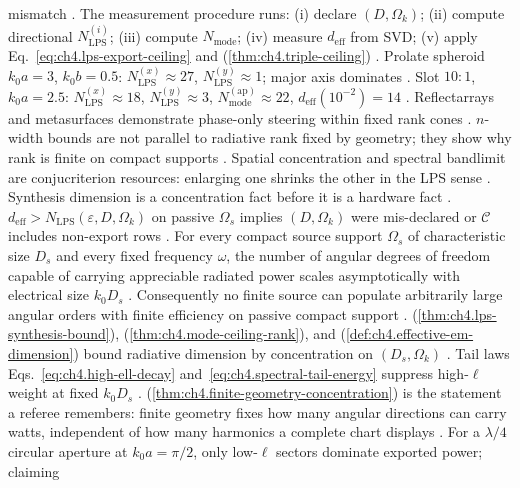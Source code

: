 mismatch \cite{hansen1988}.
The measurement procedure runs: (i) declare \((D,\Omega_{k})\); (ii) compute directional \(N_{\mathrm{LPS}}^{(i)}\); (iii) compute \(N_{\mathrm{mode}}\);
(iv) measure \(d_{\mathrm{eff}}\) from SVD; (v) apply Eq.~\eqref{eq:ch4.lps-export-ceiling} and (\ref{thm:ch4.triple-ceiling})
\cite{hansen1988}.
Prolate spheroid \(k_{0}a=3\), \(k_{0}b=0.5\): \(N_{\mathrm{LPS}}^{(x)}\approx27\), \(N_{\mathrm{LPS}}^{(y)}\approx1\); major axis dominates
\cite{hansen1988}.
Slot \(10{:}1\), \(k_{0}a=2.5\): \(N_{\mathrm{LPS}}^{(x)}\approx18\), \(N_{\mathrm{LPS}}^{(y)}\approx3\), \(N_{\mathrm{mode}}^{\mathrm{(ap)}}\approx22\),
\(d_{\mathrm{eff}}(10^{-2})=14\) \cite{hansen1988}.
Reflectarrays and metasurfaces demonstrate phase-only steering within fixed rank cones \cite{harrington2001}.
\(n\)-width bounds are not parallel to radiative rank fixed by geometry; they show why rank is finite on compact supports \cite{hansen1988}.
Spatial concentration and spectral bandlimit are conjucriterion resources: enlarging one shrinks the other in the LPS sense \cite{jackson1999}.
Synthesis dimension is a concentration fact before it is a hardware fact \cite{harrington2001}.
\label{cor:ch4.lps-domain}
\(d_{\mathrm{eff}}>N_{\mathrm{LPS}}(\varepsilon,D,\Omega_{k})\) on passive \(\Omega_{s}\) implies \((D,\Omega_{k})\) were mis-declared or
\(\mathcal{C}\) includes non-export rows \cite{hansen1988}.
\label{thm:ch4.finite-geometry-concentration}
For every compact source support $\Omega_{s}$ of characteristic size $D_{s}$ and every fixed frequency $\omega$,
the number of angular degrees of freedom capable of carrying appreciable radiated power scales asymptotically with
electrical size $k_{0}D_{s}$ \cite{stratton1941}.
Consequently no finite source can populate arbitrarily large angular orders with finite efficiency on passive
compact support \cite{devaney2004}.
(\ref{thm:ch4.lps-synthesis-bound}), (\ref{thm:ch4.mode-ceiling-rank}), and
(\ref{def:ch4.effective-em-dimension}) bound radiative dimension by concentration on $(D_{s},\Omega_{k})$
\cite{hansen1988}.
Tail laws Eqs.~\eqref{eq:ch4.high-ell-decay} and~\eqref{eq:ch4.spectral-tail-energy} suppress high-$\ell$ weight at
fixed $k_{0}D_{s}$ \cite{hansen1988}.
(\ref{thm:ch4.finite-geometry-concentration}) is the statement a referee remembers: finite geometry fixes how
many angular directions can carry watts, independent of how many harmonics a complete chart displays
\cite{harrington2001}.
For a $\lambda/4$ circular aperture at $k_{0}a=\pi/2$, only low-$\ell$ sectors dominate exported power; claiming
